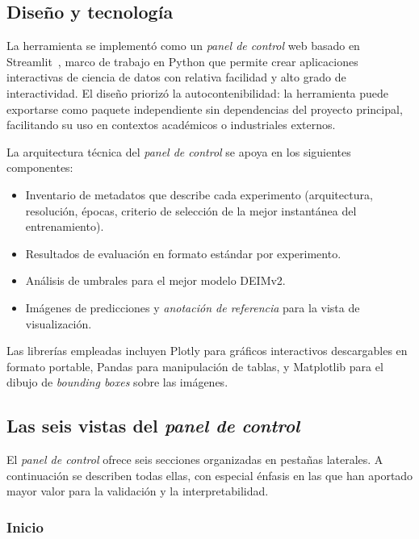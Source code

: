 \subsection{Diseño y tecnología}

La herramienta se implementó como un \textit{panel de control} web basado en \acrfull{Streamlit}~\cite{streamlit2024}, marco de trabajo en Python que permite crear aplicaciones interactivas de ciencia de datos con relativa facilidad y alto grado de interactividad. El diseño priorizó la autocontenibilidad: la herramienta puede exportarse como paquete independiente sin dependencias del proyecto principal, facilitando su uso en contextos académicos o industriales externos.

La arquitectura técnica del \textit{panel de control} se apoya en los siguientes componentes:

\begin{itemize}
    \item Inventario de metadatos que describe cada experimento (arquitectura, resolución, épocas, criterio de selección de la mejor instantánea del entrenamiento).
    \item Resultados de evaluación en formato estándar por experimento.
    \item Análisis de umbrales para el mejor modelo DEIMv2.
    \item Imágenes de predicciones y \textit{anotación de referencia} para la vista de visualización.
\end{itemize}

Las librerías empleadas incluyen Plotly para gráficos interactivos descargables en formato portable, Pandas para manipulación de tablas, y Matplotlib para el dibujo de \textit{bounding boxes} sobre las imágenes.

\subsection{Las seis vistas del \textit{panel de control}}

El \textit{panel de control} ofrece seis secciones organizadas en pestañas laterales. A continuación se describen todas ellas, con especial énfasis en las que han aportado mayor valor para la validación y la interpretabilidad.

\subsubsection{Inicio}

